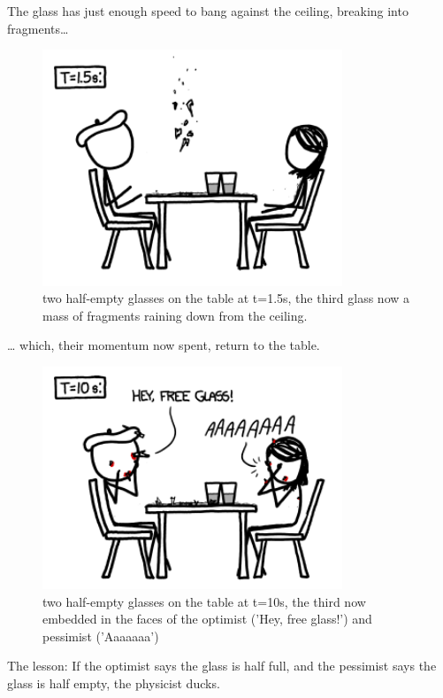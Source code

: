{The glass has just enough speed to bang against the ceiling, breaking into fragments…}

\begin{figure}[!htbp]
\centering
\includegraphics[scale=0.5, max width=0.8\textwidth]{imgs/a/6/glass_1_5s.png}
\caption{two half-empty glasses on the table at t=1.5s, the third glass now a mass of fragments raining down from the ceiling.}
\end{figure}

{… which, their momentum now spent, return to the table.}

\begin{figure}[!htbp]
\centering
\includegraphics[scale=0.5, max width=0.8\textwidth]{imgs/a/6/glass_10s.png}
\caption{two half-empty glasses on the table at t=10s, the third now embedded in the faces of the optimist ('Hey, free glass!') and pessimist ('Aaaaaaa')}
\end{figure}

{The lesson: If the optimist says the glass is half full, and the pessimist says the glass is half empty, the physicist ducks.}

